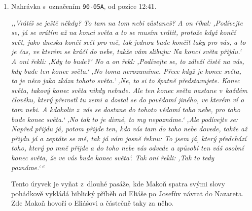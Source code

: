 \begin{enumerate}

\item{
Nahrávka s~označením \texttt{90-05A}, od pozice 12:41.

\textit{%
,,Vrátíš se ještě někdy? To tam na tom nebi zůstaneš? A on říkal: ,Podívejte se,
já se vrátím až na konci světa a to se musím vrátit, protože když končí svět,
jako dneska končí svět pro mě, tak jednou bude končit taky pro vás, a to je čas,
ve kterém se kráčí do nebe, takže vám slibuju: Na konci světa přijdu.` A oni
řekli: ,Kdy to bude?{}` No a on řekl: ,Podívejte se, to záleží čistě na vás, kdy
bude ten konec světa.` ,No tomu nerozumíme. Přece když je konec světa, to je
něco jako zkáza tohoto světa.` ,Ne, to si to špatně představujete. Konec světa,
takový konec světa nikdy nebude. Ale ten konec světa nastane v~každém člověku,
který přerostl tu zemi a dostal se do povědomí jiného, ve kterém ví o tom nebi.
A kdokoliv z~vás se dostane do tohoto vědomí toho nebe, pro toho bude konec
světa.` ,No tak to je divné, to my nepoznáme.` ,Ale podívejte se: Napřed přijdu
já, potom přijde ten, kdo vás tam do toho nebe dovede, takže až přijdu já a
zeptáte se mě, tak já vám jasně řeknu: \guillemotright{}To jsem já, který
předchází toho, který po mně přijde a do toho nebe vás odvede a způsobí ten váš
osobní konec světa, že ve vás bude konec světa\guillemotleft{}`. Tak oni řekli:
,Tak to tedy poznáme.`{}``
}

Tento úryvek je vyňat z~dlouhé pasáže, kde Makoň spatra svými slovy pohádkově
        vykládá biblický příběh od Eliáše po Josefův návrat do Nazareta. Zde
        Makoň hovoří o Eliášovi a částečně taky za něho.

}



\end{enumerate}
